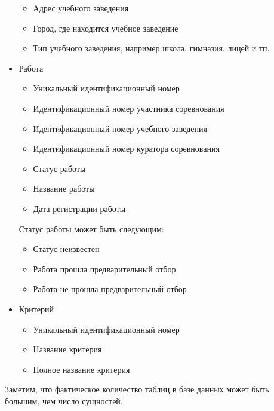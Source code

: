 \begin{itemize}
\begin{itemize}
            \item Адрес учебного заведения
            \item Город, где находится учебное заведение
            \item Тип учебного заведения, например школа, гимназия, лицей и тп.
        \end{itemize}
    \item Работа
        \begin{itemize}
            \item Уникальный идентификационный номер
            \item Идентификационный номер участника соревнования
            \item Идентификационный номер учебного заведения
            \item Идентификационный номер куратора соревнования
            \item Статус работы
            \item Название работы
            \item Дата регистрации работы
        \end{itemize}
        Статус работы может быть следующим:
        \begin{itemize}
            \item Статус неизвестен
            \item Работа прошла предварительный отбор
            \item Работа не прошла предварительный отбор
        \end{itemize}
    \item Критерий
        \begin{itemize}
            \item Уникальный идентификационный номер
            \item Название критерия
            \item Полное название критерия
        \end{itemize}
\end{itemize}

Заметим, что фактическое количество таблиц в базе данных может быть большим, чем число
сущностей.

